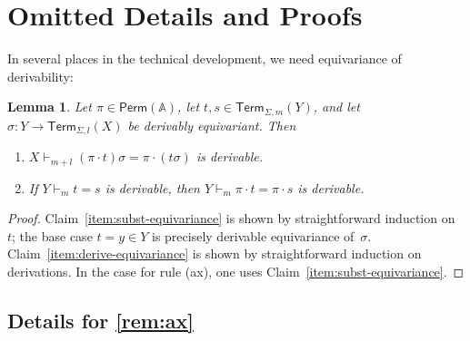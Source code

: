 \documentclass[11pt,a4paper]{amsart}
\newtheorem{lemma}[lemma]{Lemma}
\newif\iffullversion
\newcommand{\Perm}{\mathsf{Perm}(\Names)}
\newcommand{\Term}{\mathsf{Term}}
\newcommand{\Names}{\mathbb{A}}
\theoremstyle{plain}
\numberwithin{equation}{section}
\newcommand{\+}[1]{\mathcal{#1}\xspace}
\theoremstyle{definition}
\begin{document}
\iffullversion

\clearpage
\appendix

\section{Omitted Details and Proofs}

In several places in the technical development, we need equivariance
of derivability:
\begin{lemma}\label{lem:equivariance}
  Let $\pi\in \Perm$, let $t,s\in\Term_{\Sigma,m}(Y)$, and let
  \(\sigma\colon Y \to \Term_{\Sigma, l}(X)\) be derivably
  equivariant. Then
  \begin{enumerate}
  \item\label{item:subst-equivariance}
    $X\vdash_{m+l}(\pi\cdot t)\sigma=\pi\cdot(t\sigma)$ is derivable.

  \item\label{item:derive-equivariance} If $Y\vdash_mt=s$ is
    derivable, then
    \(Y \vdash_m \pi\cdot t = \pi\cdot s\) is
    derivable.
  \end{enumerate}
\end{lemma}


\begin{proof}
  Claim~\ref{item:subst-equivariance} is shown by straightforward
  induction on~$t$; the base case $t=y\in Y$ is precisely derivable
  equivariance of~$\sigma$.  Claim~\ref{item:derive-equivariance} is
  shown by straightforward induction on derivations. In the case for
  rule (ax), one uses Claim~\ref{item:subst-equivariance}.
\end{proof}
\subsection*{Details for  \cref{rem:ax}}
\end{document}
